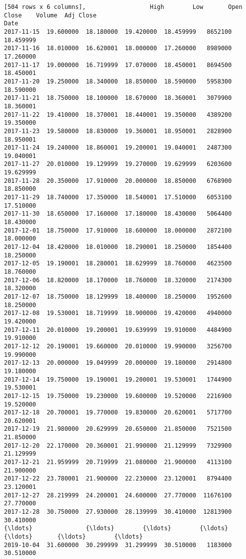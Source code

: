 \documentclass[11pt]{article}
\begin{document}
\begin{Verbatim}[commandchars=\\\{\}]
[504 rows x 6 columns],                  High        Low       Open      Close    Volume  Adj Close
Date                                                                       
2017-11-15  19.600000  18.180000  19.420000  18.459999   8652100  18.459999
2017-11-16  18.010000  16.620001  18.000000  17.260000   8989000  17.260000
2017-11-17  19.000000  16.719999  17.070000  18.450001   8694500  18.450001
2017-11-20  19.250000  18.340000  18.850000  18.590000   5958300  18.590000
2017-11-21  18.750000  18.100000  18.670000  18.360001   3079900  18.360001
2017-11-22  19.410000  18.370001  18.440001  19.350000   4389200  19.350000
2017-11-23  19.580000  18.830000  19.360001  18.950001   2828900  18.950001
2017-11-24  19.240000  18.860001  19.200001  19.040001   2487300  19.040001
2017-11-27  20.010000  19.129999  19.270000  19.629999   6203600  19.629999
2017-11-28  20.350000  17.910000  20.000000  18.850000   6768900  18.850000
2017-11-29  18.740000  17.350000  18.540001  17.510000   6053100  17.510000
2017-11-30  18.650000  17.160000  17.180000  18.430000   5064400  18.430000
2017-12-01  18.750000  17.910000  18.600000  18.000000   2872100  18.000000
2017-12-04  18.420000  18.010000  18.290001  18.250000   1854400  18.250000
2017-12-05  19.190001  18.280001  18.629999  18.760000   4623500  18.760000
2017-12-06  18.820000  18.170000  18.760000  18.320000   2174300  18.320000
2017-12-07  18.750000  18.129999  18.400000  18.250000   1952600  18.250000
2017-12-08  19.530001  18.719999  18.900000  19.420000   4940000  19.420000
2017-12-11  20.010000  19.200001  19.639999  19.910000   4484900  19.910000
2017-12-12  20.190001  19.660000  20.010000  19.990000   3256700  19.990000
2017-12-13  20.000000  19.049999  20.000000  19.180000   2914800  19.180000
2017-12-14  19.750000  19.190001  19.200001  19.530001   1744900  19.530001
2017-12-15  19.750000  19.230000  19.600000  19.520000   2216900  19.520000
2017-12-18  20.700001  19.770000  19.830000  20.620001   5717700  20.620001
2017-12-19  21.980000  20.629999  20.650000  21.850000   7521500  21.850000
2017-12-20  22.170000  20.360001  21.990000  21.129999   7329900  21.129999
2017-12-21  21.959999  20.719999  21.080000  21.900000   4113100  21.900000
2017-12-22  23.780001  21.900000  22.230000  23.120001   8794400  23.120001
2017-12-27  28.219999  24.200001  24.600000  27.770000  11676100  27.770000
2017-12-28  30.750000  27.930000  28.139999  30.410000  12813900  30.410000
{\ldots}               {\ldots}        {\ldots}        {\ldots}        {\ldots}       {\ldots}        {\ldots}
2019-10-04  31.600000  30.299999  31.299999  30.510000   1183000  30.510000

\end{Verbatim}
\end{document}
